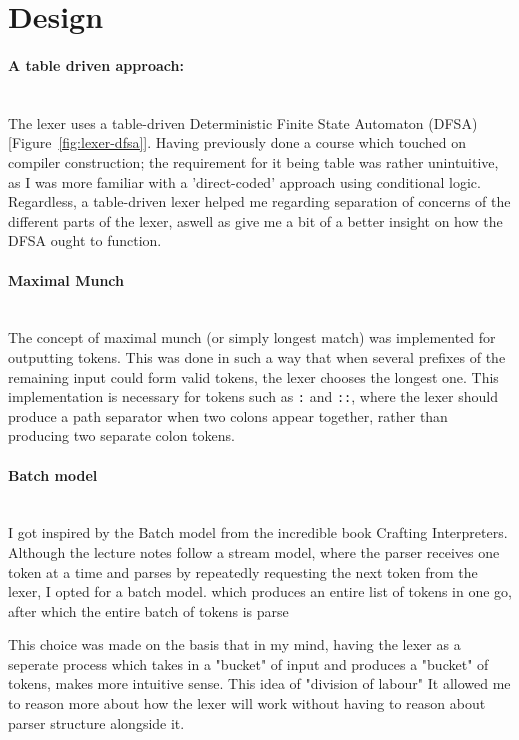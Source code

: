 \documentclass[11pt,a4paper,oneside]{report}
\begin{document}
	\section{Design}
	\paragraph{A table driven approach:}\mbox{}\\
	The lexer uses a table-driven Deterministic Finite State Automaton (DFSA)[Figure~\ref{fig:lexer-dfsa}]. Having previously done a course which touched on compiler construction; the requirement for it being table was rather unintuitive, as I was more familiar with a 'direct-coded' approach using conditional logic. Regardless, a table-driven lexer helped me regarding separation of concerns of the different parts of the lexer, aswell as give me a bit of a better insight on how the DFSA ought to function. 
	
	\paragraph{Maximal Munch}\mbox{}\\
	The concept of maximal munch (or simply longest match) was implemented for outputting tokens. This was done in such a way that when several prefixes of the remaining input could form valid tokens, the lexer chooses the longest one\cite{reps1998maximalmunch}. This implementation is necessary for tokens such as \texttt{:} and \texttt{::}, where the lexer should produce a path separator when two colons appear together, rather than producing two separate colon tokens.
	
	\paragraph{Batch model}\mbox{}\\
	I got inspired by the Batch model from the incredible book Crafting Interpreters\cite{nystrom2021crafting}. Although the lecture notes follow a stream model, where the parser receives one token at a time and parses by repeatedly requesting the next token from the lexer, I opted for a batch model.  which produces an entire list of tokens in one go, after which the entire batch of tokens is parse
	
	This choice was made on the basis that in my mind, having the lexer as a seperate process which takes in a "bucket" of input and produces a "bucket" of tokens, makes more intuitive sense. This idea of "division of labour" It allowed me to reason more about how the lexer will work without having to reason about parser structure alongside it. 
	
\end{document}
